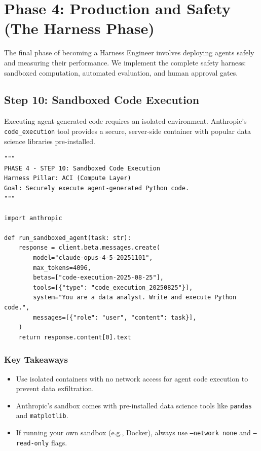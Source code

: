 \chapter{Phase 4: Production and Safety (The Harness Phase)}

The final phase of becoming a Harness Engineer involves deploying agents safely and measuring their performance. We implement the complete safety harness: sandboxed computation, automated evaluation, and human approval gates.

\section{Step 10: Sandboxed Code Execution}
Executing agent-generated code requires an isolated environment. Anthropic's \texttt{code\_execution} tool provides a secure, server-side container with popular data science libraries pre-installed.

\begin{lstlisting}[caption={step10\_sandboxed\_agent.py}, label={lst:step10}]
"""
PHASE 4 - STEP 10: Sandboxed Code Execution
Harness Pillar: ACI (Compute Layer)
Goal: Securely execute agent-generated Python code.
"""

import anthropic

def run_sandboxed_agent(task: str):
    response = client.beta.messages.create(
        model="claude-opus-4-5-20251101",
        max_tokens=4096,
        betas=["code-execution-2025-08-25"],
        tools=[{"type": "code_execution_20250825"}],
        system="You are a data analyst. Write and execute Python code.",
        messages=[{"role": "user", "content": task}],
    )
    return response.content[0].text
\end{lstlisting}

\subsection*{Key Takeaways}
\begin{itemize}
    \item Use isolated containers with no network access for agent code execution to prevent data exfiltration.
    \item Anthropic's sandbox comes with pre-installed data science tools like \texttt{pandas} and \texttt{matplotlib}.
    \item If running your own sandbox (e.g., Docker), always use \texttt{--network none} and \texttt{--read-only} flags.
\end{itemize}

